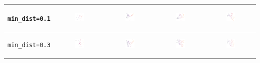 \begin{tabular}{c|c|c|c|c}
	\begin{sideways} \verb|min_dist=0.1| \end{sideways} & \includegraphics*[width = 0.2\textwidth]{min=0,1,n=2.png} & \includegraphics*[width = 0.2\textwidth]{min=0,1,n=3.png} & \includegraphics*[width = 0.2\textwidth]{min=0,1,n=4.png} & \includegraphics*[width = 0.2\textwidth]{min=0,1,n=5.png}\\
	\hline
	\begin{sideways} \verb|min_dist=0.3| \end{sideways} & \includegraphics*[width = 0.2\textwidth]{min=0,3,n=2.png} & \includegraphics*[width = 0.2\textwidth]{min=0,3,n=3.png} & \includegraphics*[width = 0.2\textwidth]{min=0,3,n=4.png} & \includegraphics*[width = 0.2\textwidth]{min=0,3,n=5.png}\\

\end{tabular}
